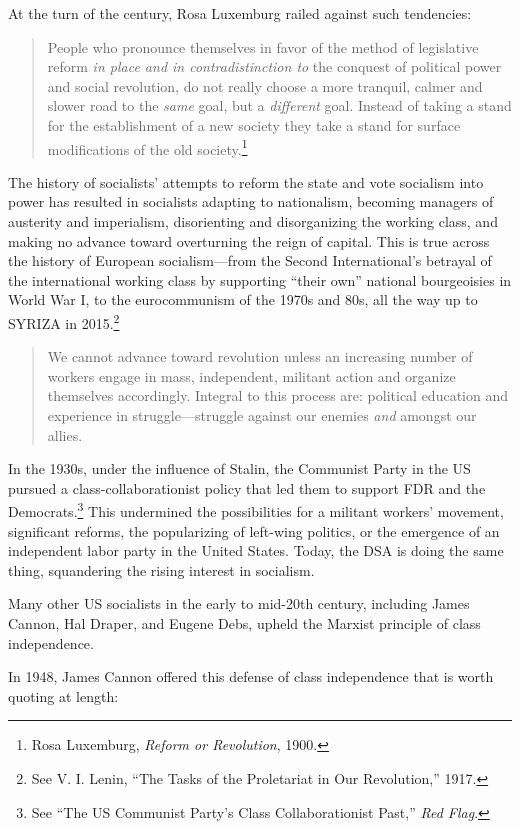 At the turn of the century, Rosa Luxemburg railed against such tendencies:

\blockquote{People who pronounce themselves in favor of the method of legislative reform \emph{in place and in contradistinction to} the conquest of political power and social revolution, do not really choose a more tranquil, calmer and slower road to the \emph{same} goal, but a \emph{different} goal. Instead of taking a stand for the establishment of a new society they take a stand for surface modifications of the old society.\footnote{Rosa Luxemburg, \emph{Reform or Revolution}, 1900.}}

The history of socialists' attempts to reform the state and vote socialism into power has resulted in socialists adapting to nationalism, becoming managers of austerity and imperialism, disorienting and disorganizing the working class, and making no advance toward overturning the reign of capital. This is true across the history of European socialism---from the Second International's betrayal of the international working class by supporting ``their own'' national bourgeoisies in World War I, to the eurocommunism of the 1970s and 80s, all the way up to SYRIZA in 2015.\footnote{See V. I. Lenin, ``The Tasks of the Proletariat in Our Revolution,'' 1917.}

\blockquote{We cannot advance toward revolution unless an increasing number of workers engage in mass, independent, militant action and organize themselves accordingly. Integral to this process are: political education and experience in struggle---struggle against our enemies \emph{and} amongst our allies.}

In the 1930s, under the influence of Stalin, the Communist Party in the US pursued a class-collaborationist policy that led them to support FDR and the Democrats.\footnote{See ``The US Communist Party's Class Collaborationist Past,'' \emph{Red Flag}.} This undermined the possibilities for a militant workers' movement, significant reforms, the popularizing of left-wing politics, or the emergence of an independent labor party in the United States. Today, the DSA is doing the same thing, squandering the rising interest in socialism.

Many other US socialists in the early to mid-20th century, including James Cannon, Hal Draper, and Eugene Debs, upheld the Marxist principle of class independence.

In 1948, James Cannon offered this defense of class independence that is worth quoting at length:

